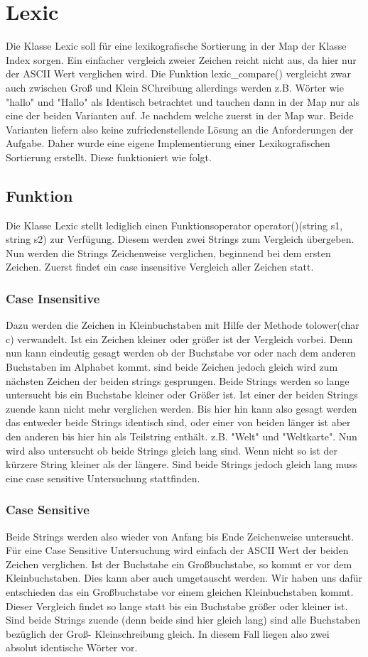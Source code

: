 \section{Lexic}
Die Klasse Lexic soll für eine lexikografische Sortierung in der Map der Klasse Index sorgen. Ein einfacher vergleich zweier Zeichen reicht nicht aus, da hier nur der ASCII Wert verglichen wird. Die Funktion lexic_compare() vergleicht zwar auch zwischen Groß und Klein SChreibung allerdings werden z.B. Wörter wie "hallo" und "Hallo" als Identisch betrachtet und tauchen dann in der Map nur als eine der beiden Varianten auf. Je nachdem welche zuerst in der Map war. Beide Varianten liefern also keine zufriedenstellende Lösung an die Anforderungen der Aufgabe. Daher wurde eine eigene Implementierung einer Lexikografischen Sortierung erstellt. Diese funktioniert wie folgt.
\subsection{Funktion}
Die Klasse Lexic stellt lediglich einen Funktionsoperator operator()(string s1, string s2) zur Verfügung. Diesem werden zwei Strings zum Vergleich übergeben. Nun werden die Strings Zeichenweise verglichen, beginnend bei dem ersten Zeichen. Zuerst findet ein case insensitive Vergleich aller Zeichen statt. 
\subsubsection{Case Insensitive}
Dazu werden die Zeichen in Kleinbuchstaben mit Hilfe der Methode tolower(char c) verwandelt. Ist ein Zeichen kleiner oder größer ist der Vergleich vorbei. Denn nun kann eindeutig gesagt werden ob der Buchstabe vor oder nach dem anderen Buchstaben im Alphabet kommt. sind beide Zeichen jedoch gleich wird zum nächsten Zeichen der beiden strings gesprungen. Beide Strings werden so lange untersucht bis ein Buchstabe kleiner oder Größer ist. Ist einer der beiden Strings zuende kann nicht mehr verglichen werden. Bis hier hin kann also gesagt werden das entweder beide Strings identisch sind, oder einer von beiden länger ist aber den anderen bis hier hin als Teilstring enthält. z.B. "Welt" und "Weltkarte". Nun wird also untersucht ob beide Strings gleich lang sind. Wenn nicht so ist der kürzere String kleiner als der längere. Sind beide Strings jedoch gleich lang muss eine case sensitive Untersuchung stattfinden. 
\subsubsection{Case Sensitive}
Beide Strings werden also wieder von Anfang bis Ende Zeichenweise untersucht. Für eine Case Sensitive Untersuchung wird einfach der ASCII Wert der beiden Zeichen verglichen. Ist der Buchstabe ein Großbuchstabe, so kommt er vor dem Kleinbuchstaben. Dies kann aber auch umgetauscht werden. Wir haben uns dafür entschieden das ein Großbuchstabe vor einem gleichen Kleinbuchstaben kommt.
Dieser Vergleich findet so lange statt bis ein Buchstabe größer oder kleiner ist. Sind beide Strings zuende (denn beide sind hier gleich lang) sind alle Buchstaben bezüglich der Groß- Kleinschreibung gleich. In diesem Fall liegen also zwei absolut identische Wörter vor. 
